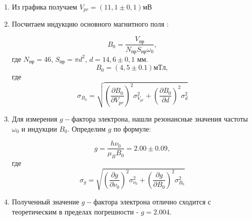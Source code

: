 \documentclass[a4paper]{article}
\begin{document}
\begin{enumerate}
    \item Из графика получаем $V_{pr} = (11,1 \pm 0,1)$мВ
    
    \item Посчитаем индукцию основного магнитного поля :
    
    \begin{equation}
        B_0 = \frac{V_{пр}}{N_{пр}S_{пр}\omega_0} \label{eq9},
    \end{equation}    
    где $N_{пр} = 46$, $S_{пр} = \pi d^2$, $d = 14,6 \pm 0,1$ мм.
    \begin{equation}
        B_0 = (4,5 \pm  0.1)мТл \label{eq10}, 
    \end{equation} 
    где 
    \begin{equation}
        \sigma_{B_0} = \sqrt{(\frac{\partial B_0}{\partial V_{pr}})^2\sigma_{V_{pr}}^2+(\frac{\partial B_0}{\partial d})^2\sigma^2_{d}}  \label{eq11}
    \end{equation}

    \item Для измерения $g-$фактора электрона, нашли резонансные значения частоты $\omega_0$ и индукции $B_0$.  Определим $g$ по формуле:
    
    \begin{equation}
        g = \frac{h \nu_0}{\mu_B B_0} = 2.00 \pm 0.09 \label{eq12}, 
    \end{equation}
    где 
    \begin{equation}
        \sigma_{g} = \sqrt{(\frac{\partial g}{\partial \nu_0})^2\sigma_{\nu_0}^2+(\frac{\partial g}{\partial B_0})^2\sigma^2_{B_0}}  \label{eq13}
    \end{equation}
    \item Полученный значение $g-фактора$ электрона отлично сходится с теоретическим в пределах погрешности - $g = 2.004$.
\end{enumerate}
\end{document}

